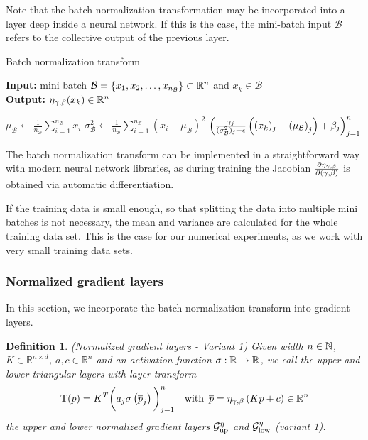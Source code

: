 \documentclass[twoside,a4paper]{article}
\newtheorem{definition}{Definition}
\begin{document}
Note that the batch normalization transformation may be incorporated into a layer
deep inside a neural network. If this is the case, the mini-batch input $\mathcal{B}$ 
refers to the collective output of the previous layer.

\begin{algorithm}\label{algo_batch_norm}
	\caption{Batch normalization transform}
	\textbf{Input:} mini batch $\mathcal{B} = \{x_1, x_2, \dots, x_{n_\mathcal{B}}\} \subset \mathbb{R}^n$ 
	and $x_k \in \mathcal{B}$ \\
	\textbf{Output:} $\eta_{\gamma, \beta}(x_k) \in \mathbb{R}^n$
	\begin{algorithmic}
		 
			\State $\mu_\mathcal{B} \gets \frac{1}{n_\mathcal{B}} \sum_{i=1}^{n_\mathcal{B}} x_i$
			\State $\sigma^2_\mathcal{B} \gets \frac{1}{n_\mathcal{B}} \sum_{i=1}^{n_\mathcal{B}} 
			(x_i - \mu_\mathcal{B})^2$
		\EndIf
		\State \Return 
		$\left( \frac{\gamma_j}{(\sigma^2_\mathcal{B})_j + \epsilon} 
		\left( (x_k)_j - \left( \mu_\mathcal{B} \right)_j \right) + \beta_j \right)_{j=1}^n$
	\end{algorithmic}
\end{algorithm}

The batch normalization transform can be implemented in a straightforward way with modern
neural network libraries, as during training the Jacobian $\frac{\partial \eta_{\gamma, \beta}}{\partial (\gamma, \beta)}$ 
is obtained via automatic differentiation.

If the training data is small enough, so that splitting the data into multiple mini batches
is not necessary, the mean and variance are calculated for the whole training data set. This is the
case for our numerical experiments, as we work with very small training data sets.

\subsubsection{Normalized gradient layers}

In this section, we incorporate the batch normalization transform into gradient layers.

\begin{definition}\label{def_norm_gradient_layers_1}
	(Normalized gradient layers - Variant 1)
	Given width $n \in \mathbb{N}$, $K \in \mathbb{R}^{n \times d}$, $a,c \in \mathbb{R}^n$ and
	an activation function $\sigma : \mathbb{R} \to \mathbb{R}$,
	we call the upper and lower triangular layers with layer transform
	\begin{equation*}
		\mathrm{T}(p) = K^T \bigg( a_j \sigma
		\left( \overline{p}_j \right) \bigg)_{j=1}^n
		\quad \text{with } \, \overline{p} = \eta_{\gamma, \beta} \left( Kp + c \right) \in \mathbb{R}^n
	\end{equation*}
	the upper and lower normalized gradient layers 
	$\mathcal{G}_{\text{up}}^{\eta}$ and $\mathcal{G}_{\text{low}}^{\eta}$ (variant 1).
\end{definition}
\end{document}
